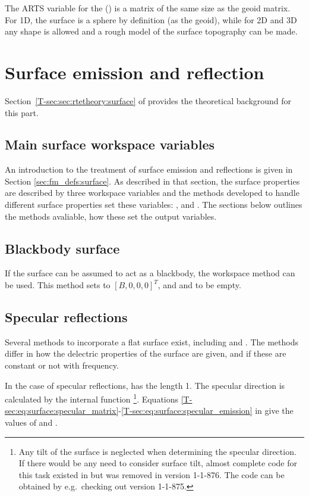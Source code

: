 The ARTS variable for the 
() is a matrix of the same size as the geoid
matrix. For 1D, the surface is a sphere by definition (as the geoid),
while for 2D and 3D any shape is allowed and a rough model of the
surface topography can be made. 




\section{Surface emission and reflection}

Section~\ref{T-sec:sec:rtetheory:surface} of \theory provides the theoretical
background for this part.


\subsection{Main surface workspace variables}
\label{sec:surface:surface:wsvs}
An introduction to the treatment of surface emission and reflections is given
in Section \ref{sec:fm_defs:surface}. As described in that section, the surface
properties are described by three workspace variables and the methods developed
to handle different surface properties set these variables:
,  and
. The sections below outlines the methods avaliable,
how these set the output variables.


\subsection{Blackbody surface}
%
If the surface can be assumed to act as a blackbody, the workspace method
 can be used. This method sets
 to $[B,0,0,0]^T$, and 
and  to be empty.




\subsection{Specular reflections}
%
Several methods to incorporate a flat surface exist, including
 and
. The methods differ in how the delectric
properties of the surface are given, and if these are constant or not with
frequency.

In the case of specular reflections,  has the length 1.
The specular direction is calculated by the internal function
\footnote{Any tilt of the surface is
  neglected when determining the specular direction. If there would be any need
  to consider surface tilt, almost complete code for this task existed in
   but was removed in version 1-1-876. The
  code can be obtained by e.g.\ checking out version 1-1-875.}. Equations
\ref{T-sec:eq:surface:specular_matrix}-\ref{T-sec:eq:surface:specular_emission}
in \theory give the values of  and
.




